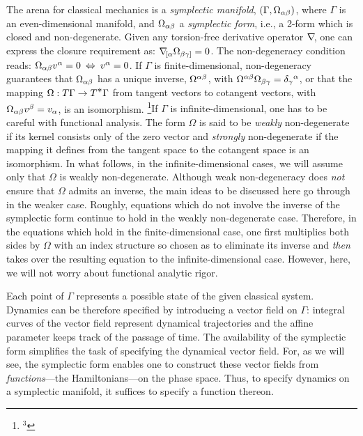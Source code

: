 The arena for classical mechanics is a {\it symplectic manifold}, $(\Gamma,
\Omega_{\alpha\beta})$, where $\Gamma$ is an even-dimensional manifold, and $\Omega_{\alpha\beta}$
a {\it symplectic form}, i.e., a 2-form which is closed and non-degenerate.
Given any torsion-free derivative operator $\nabla\! $, one can express the closure
requirement as:  $\nabla\!_{[\alpha}\Omega_{\beta\gamma]}=0$. The non-degeneracy
condition reads: $\Omega_{\alpha\beta} v^\alpha=0\>\Leftrightarrow\> v^\alpha=0$. If
$\Gamma$ is finite-dimensional, non-degeneracy guarantees that $\Omega_{\alpha\beta}$ has
a unique inverse, $\Omega^{\alpha\beta}$, with $\Omega^{\alpha\beta}\Omega_{\beta\gamma}=
\delta_\gamma{}^\alpha$, or that the mapping $\Omega: T\Gamma\rightarrow T^{\displaystyle\ast}
\Gamma$ from tangent vectors to cotangent vectors, with $\Omega_{\alpha\beta} v^\beta
=v_\alpha$, is an isomorphism.%
   \footnote{$^3$}{If $\Gamma$ is infinite-dimensional, one has to be careful
   with functional analysis. The form $\Omega$ is said to be {\it weakly}
   non-degenerate if its kernel consists only of the zero vector and
   {\it strongly} non-degenerate if the mapping it defines from the tangent
   space to the cotangent space is an isomorphism. In what follows, in the
   infinite-dimensional cases, we will assume only that $\Omega$ is weakly
   non-degenerate. Although weak non-degeneracy does {\it not} ensure that
   $\Omega$ admits an inverse, the main ideas to be discussed here
   go through in the weaker case. Roughly, equations which do not
   involve the inverse of the symplectic form continue to hold in the weakly
   non-degenerate case. Therefore, in the equations which hold in the
   finite-dimensional case, one first multiplies both sides by $\Omega$ with
   an index structure so chosen as to eliminate its inverse and {\it then}
   takes over the resulting equation to the infinite-dimensional case.
   However, here, we will not worry about functional analytic rigor.}

Each point of $\Gamma$ represents a possible state of the given classical
system. Dynamics can be therefore specified by introducing a vector field on
$\Gamma$: integral curves of the vector field represent dynamical trajectories
and the affine parameter keeps track of the passage of time. The availability
of
the symplectic form simplifies the task of specifying the dynamical vector
field. For, as we will see, the symplectic form enables one to construct
these vector fields from {\it functions}---the Hamiltonians---on the phase
space. Thus, to specify dynamics on a symplectic manifold, it suffices to
specify a function thereon.

